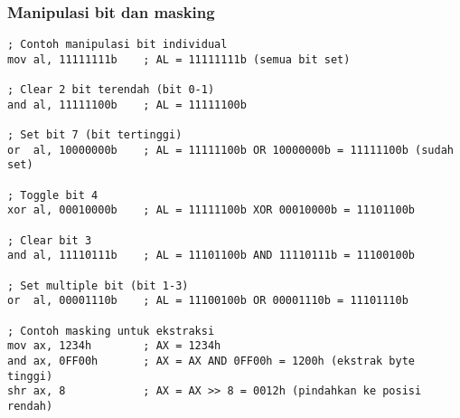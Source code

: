 \documentclass[../main.tex]{subfiles}
\begin{document}
            \subsubsection{Manipulasi bit dan masking}
\begin{lstlisting}[language={[x86masm]Assembler}, caption=Manipulasi Bit dan Masking, label={lst:bit-manipulation}]
; Contoh manipulasi bit individual
mov al, 11111111b    ; AL = 11111111b (semua bit set)

; Clear 2 bit terendah (bit 0-1)
and al, 11111100b    ; AL = 11111100b

; Set bit 7 (bit tertinggi)
or  al, 10000000b    ; AL = 11111100b OR 10000000b = 11111100b (sudah set)

; Toggle bit 4
xor al, 00010000b    ; AL = 11111100b XOR 00010000b = 11101100b

; Clear bit 3
and al, 11110111b    ; AL = 11101100b AND 11110111b = 11100100b

; Set multiple bit (bit 1-3)
or  al, 00001110b    ; AL = 11100100b OR 00001110b = 11101110b

; Contoh masking untuk ekstraksi
mov ax, 1234h        ; AX = 1234h
and ax, 0FF00h       ; AX = AX AND 0FF00h = 1200h (ekstrak byte tinggi)
shr ax, 8            ; AX = AX >> 8 = 0012h (pindahkan ke posisi rendah)
\end{lstlisting}
\end{document}
